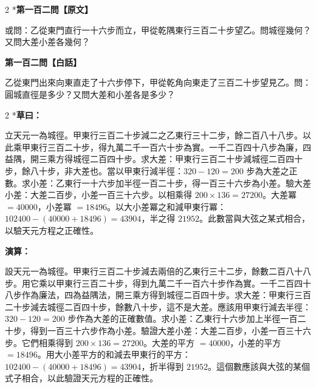 \documentclass[11pt,a4paper]{article}
\begin{document}
\vspace{0.1cm}
\noindent{}
\par\vspace{0.3cm}

\begin{paracol}{2}
\switchcolumn[0]*\noindent\textbf{第一百二問【原文】}

\small 或問：乙從東門直行一十六步而立，甲從乾隅東行三百二十步望乙。問城徑幾何？又問大差小差各幾何？

\switchcolumn\noindent\textbf{第一百二問【白話】}

\small 乙從東門出來向東直走了十六步停下，甲從乾角向東走了三百二十步望見乙。問：圓城直徑是多少？又問大差和小差各是多少？
\end{paracol}

\vspace{0.1cm}
\noindent{}
\par\vspace{0.15cm}

\begin{paracol}{2}
\switchcolumn[0]*\textbf{草曰：}

\small 立天元一為城徑。甲東行三百二十步減二之乙東行三十二步，餘二百八十八步。以此乘甲東行三百二十步，得九萬二千一百六十步為實。一千二百四十八步為廉，四益隅，開三乘方得城徑二百四十步。求大差：甲東行三百二十步減城徑二百四十步，餘八十步，非大差也。當以甲東行減半徑：$320 - 120 = 200$ 步為大差之正數。求小差：乙東行一十六步加半徑一百二十步，得一百三十六步為小差。驗大差小差：大差二百步，小差一百三十六步。以相乘得 $200 \times 136 = 27200$。大差冪 $= 40000$，小差冪 $= 18496$。以大小差冪之和減甲東行冪：$102400 - (40000 + 18496) = 43904$，半之得 $21952$。此數當與大弦之某式相合，以驗天元方程之正確性。

\switchcolumn\textbf{演算：}

\small 設天元一為城徑。甲東行三百二十步減去兩倍的乙東行三十二步，餘數二百八十八步。用它乘以甲東行三百二十步，得到九萬二千一百六十步作為實。一千二百四十八步作為廉法，四為益隅法，開三乘方得到城徑二百四十步。求大差：甲東行三百二十步減去城徑二百四十步，餘數八十步，這不是大差。應該用甲東行減去半徑：$320 - 120 = 200$ 步作為大差的正確數值。求小差：乙東行十六步加上半徑一百二十步，得到一百三十六步作為小差。驗證大差小差：大差二百步，小差一百三十六步。它們相乘得到 $200 \times 136 = 27200$。大差的平方 $= 40000$，小差的平方 $= 18496$。用大小差平方的和減去甲東行的平方：$102400 - (40000 + 18496) = 43904$，折半得到 $21952$。這個數應該與大弦的某個式子相合，以此驗證天元方程的正確性。
\end{paracol}
\end{document}
